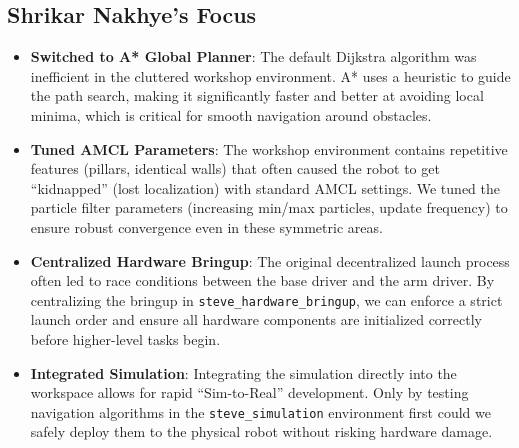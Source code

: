 \documentclass[12pt,oneside,a4paper]{article}
\begin{document}
\subsection{Shrikar Nakhye's Focus}
\begin{itemize}
    \item \textbf{Switched to A* Global Planner}: The default Dijkstra algorithm was inefficient in the cluttered workshop environment. A* uses a heuristic to guide the path search, making it significantly faster and better at avoiding local minima, which is critical for smooth navigation around obstacles.
    \item \textbf{Tuned AMCL Parameters}: The workshop environment contains repetitive features (pillars, identical walls) that often caused the robot to get ``kidnapped'' (lost localization) with standard AMCL settings. We tuned the particle filter parameters (increasing min/max particles, update frequency) to ensure robust convergence even in these symmetric areas.
    \item \textbf{Centralized Hardware Bringup}: The original decentralized launch process often led to race conditions between the base driver and the arm driver. By centralizing the bringup in \texttt{steve\_hardware\_bringup}, we can enforce a strict launch order and ensure all hardware components are initialized correctly before higher-level tasks begin.
    \item \textbf{Integrated Simulation}: Integrating the simulation directly into the workspace allows for rapid ``Sim-to-Real'' development. Only by testing navigation algorithms in the \texttt{steve\_simulation} environment first could we safely deploy them to the physical robot without risking hardware damage.
\end{itemize}
\end{document}
